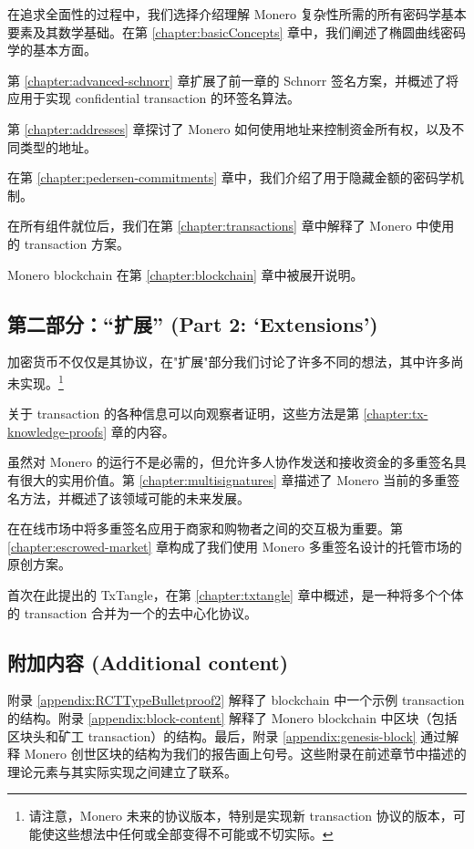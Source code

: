 在追求全面性的过程中，我们选择介绍理解 Monero 复杂性所需的所有密码学基本要素及其数学基础。在第 \ref{chapter:basicConcepts} 章中，我们阐述了椭圆曲线密码学的基本方面。

第 \ref{chapter:advanced-schnorr} 章扩展了前一章的 Schnorr 签名方案，并概述了将应用于实现 confidential transaction 的环签名算法。

第 \ref{chapter:addresses} 章探讨了 Monero 如何使用地址来控制资金所有权，以及不同类型的地址。

在第 \ref{chapter:pedersen-commitments} 章中，我们介绍了用于隐藏金额的密码学机制。

在所有组件就位后，我们在第 \ref{chapter:transactions} 章中解释了 Monero 中使用的 transaction 方案。

Monero blockchain 在第 \ref{chapter:blockchain} 章中被展开说明。


\subsection{第二部分：``扩展'' (Part 2: `Extensions')}

加密货币不仅仅是其协议，在"扩展"部分我们讨论了许多不同的想法，其中许多尚未实现。\footnote{请注意，Monero 未来的协议版本，特别是实现新 transaction 协议的版本，可能使这些想法中任何或全部变得不可能或不切实际。}

关于 transaction 的各种信息可以向观察者证明，这些方法是第 \ref{chapter:tx-knowledge-proofs} 章的内容。

虽然对 Monero 的运行不是必需的，但允许多人协作发送和接收资金的多重签名具有很大的实用价值。第 \ref{chapter:multisignatures} 章描述了 Monero 当前的多重签名方法，并概述了该领域可能的未来发展。

在在线市场中将多重签名应用于商家和购物者之间的交互极为重要。第 \ref{chapter:escrowed-market} 章构成了我们使用 Monero 多重签名设计的托管市场的原创方案。

首次在此提出的 TxTangle，在第 \ref{chapter:txtangle} 章中概述，是一种将多个个体的 transaction 合并为一个的去中心化协议。


\subsection{附加内容 (Additional content)}

附录 \ref{appendix:RCTTypeBulletproof2} 解释了 blockchain 中一个示例 transaction 的结构。附录 \ref{appendix:block-content} 解释了 Monero blockchain 中区块（包括区块头和矿工 transaction）的结构。最后，附录 \ref{appendix:genesis-block} 通过解释 Monero 创世区块的结构为我们的报告画上句号。这些附录在前述章节中描述的理论元素与其实际实现之间建立了联系。


